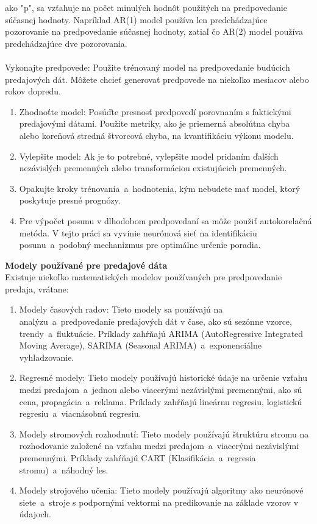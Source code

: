     ako "p", sa vzťahuje na počet minulých hodnôt použitých na predpovedanie súčasnej hodnoty. Napríklad AR(1) model
    používa len predchádzajúce pozorovanie na predpovedanie súčasnej hodnoty, zatiaľ čo AR(2) model používa predchádzajúce
    dve pozorovania.\\
    \\
    Vykonajte predpovede: Použite trénovaný model na predpovedanie budúcich predajových dát. Môžete chcieť generovať
    predpovede na niekoľko mesiacov alebo rokov dopredu.
    \begin{enumerate}
        \item Zhodnoťte model: Posúďte presnosť predpovedí porovnaním s faktickými predajovými dátami. Použite metriky,
        ako je priemerná absolútna chyba alebo koreňová stredná štvorcová chyba, na kvantifikáciu výkonu modelu.
        \item Vylepšite model: Ak je to potrebné, vylepšite model pridaním ďalších nezávislých premenných alebo
        transformáciou existujúcich premenných.
        \item Opakujte kroky trénovania~a~hodnotenia, kým nebudete mať model, ktorý poskytuje presné prognózy.
        \item Pre výpočet posunu v dlhodobom predpovedaní sa môže použiť autokorelačná metóda. V tejto práci sa
        vyvinie neurónová sieť na identifikáciu posunu~a~podobný mechanizmus pre optimálne určenie poradia.
    \end{enumerate}
    \textbf{Modely používané pre predajové dáta} \\
    Existuje niekoľko matematických modelov používaných pre predpovedanie predaja, vrátane:\\
    \begin{enumerate}
        \item Modely časových radov: Tieto modely sa používajú na analýzu~a~predpovedanie predajových dát v čase,
        ako sú sezónne vzorce, trendy~a~fluktuácie. Príklady zahŕňajú ARIMA (AutoRegressive Integrated Moving Average),
        SARIMA (Seasonal ARIMA)~a~exponenciálne vyhladzovanie.
        \item Regresné modely: Tieto modely používajú historické údaje na určenie vzťahu medzi predajom~a~jednou alebo
        viacerými nezávislými premennými, ako sú cena, propagácia~a~reklama. Príklady zahŕňajú lineárnu regresiu,
        logistickú regresiu~a~viacnásobnú regresiu.
        \item Modely stromových rozhodnutí: Tieto modely používajú štruktúru stromu na rozhodovanie založené na vzťahu medzi
        predajom~a~viacerými nezávislými premennými. Príklady zahŕňajú CART (Klasifikácia~a~regresia stromu)~a~náhodný les.
        \item Modely strojového učenia: Tieto modely používajú algoritmy ako neurónové siete~a~stroje s podpornými
        vektormi na predikovanie na základe vzorov v údajoch.
    \end{enumerate}
